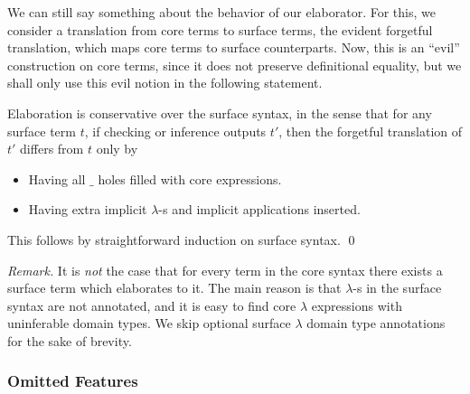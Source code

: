 \documentclass[acmsmall,screen,dvipsnames]{acmart}\settopmatter{}
\theoremstyle{remark}
\begin{document}
We can still say something about the behavior of our elaborator. For this, we
consider a translation from core terms to surface terms, the evident forgetful
translation, which maps core terms to surface counterparts. Now, this is an
``evil'' construction on core terms, since it does not preserve definitional
equality, but we shall only use this evil notion in the following statement.

\begin{theorem}[Conservativity]\label{thm:conservativity}
Elaboration is conservative over the surface syntax, in the sense that for any
surface term $t$, if checking or inference outputs $t'$, then the forgetful
translation of $t'$ differs from $t$ only by
  \begin{itemize}
    \item Having all $\_$ holes filled with core expressions.
    \item Having extra implicit $\lambda$-s and implicit applications inserted.
  \end{itemize}
This follows by straightforward induction on surface syntax. \qed
\end{theorem}

\emph{Remark.} It is \emph{not} the case that for every term in the core syntax
there exists a surface term which elaborates to it. The main reason is that
$\lambda$-s in the surface syntax are not annotated, and it is easy to find core
$\lambda$ expressions with uninferable domain types. We skip optional surface
$\lambda$ domain type annotations for the sake of brevity.

\subsubsection{Omitted Features}
\end{document}
